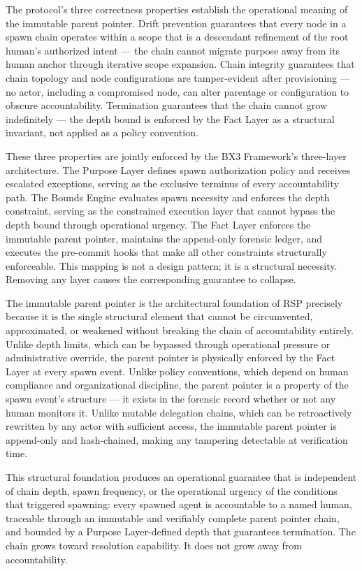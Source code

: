 The protocol's three correctness properties establish the operational meaning of the immutable parent pointer. Drift prevention guarantees that every node in a spawn chain operates within a scope that is a descendant refinement of the root human's authorized intent — the chain cannot migrate purpose away from its human anchor through iterative scope expansion. Chain integrity guarantees that chain topology and node configurations are tamper-evident after provisioning — no actor, including a compromised node, can alter parentage or configuration to obscure accountability. Termination guarantees that the chain cannot grow indefinitely — the depth bound is enforced by the Fact Layer as a structural invariant, not applied as a policy convention.

These three properties are jointly enforced by the BX3 Framework's three-layer architecture. The Purpose Layer defines spawn authorization policy and receives escalated exceptions, serving as the exclusive terminus of every accountability path. The Bounds Engine evaluates spawn necessity and enforces the depth constraint, serving as the constrained execution layer that cannot bypass the depth bound through operational urgency. The Fact Layer enforces the immutable parent pointer, maintains the append-only forensic ledger, and executes the pre-commit hooks that make all other constraints structurally enforceable. This mapping is not a design pattern; it is a structural necessity. Removing any layer causes the corresponding guarantee to collapse.

The immutable parent pointer is the architectural foundation of RSP precisely because it is the single structural element that cannot be circumvented, approximated, or weakened without breaking the chain of accountability entirely. Unlike depth limits, which can be bypassed through operational pressure or administrative override, the parent pointer is physically enforced by the Fact Layer at every spawn event. Unlike policy conventions, which depend on human compliance and organizational discipline, the parent pointer is a property of the spawn event's structure — it exists in the forensic record whether or not any human monitors it. Unlike mutable delegation chains, which can be retroactively rewritten by any actor with sufficient access, the immutable parent pointer is append-only and hash-chained, making any tampering detectable at verification time.

This structural foundation produces an operational guarantee that is independent of chain depth, spawn frequency, or the operational urgency of the conditions that triggered spawning: every spawned agent is accountable to a named human, traceable through an immutable and verifiably complete parent pointer chain, and bounded by a Purpose Layer-defined depth that guarantees termination. The chain grows toward resolution capability. It does not grow away from accountability.

